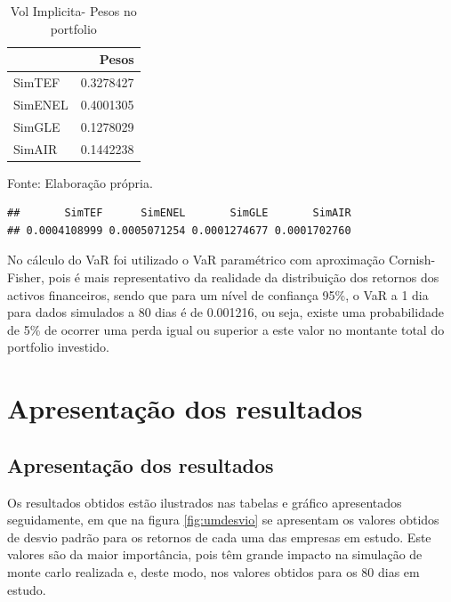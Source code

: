 \documentclass[
  12pt,
  a4paper,
  openany]{book}
\begin{document}
\begin{table}[!h]

\caption{\label{tab:minVIk}Vol Implicita- Pesos no portfolio}
\centering
\begin{tabular}[t]{lr}
\toprule
  & Pesos\\
\midrule
SimTEF & 0.3278427\\
SimENEL & 0.4001305\\
SimGLE & 0.1278029\\
SimAIR & 0.1442238\\
\bottomrule
\end{tabular}
\end{table}
\FloatBarrier
\centering

Fonte: Elaboração própria.

\justifying
\bigskip

\begin{verbatim}
##       SimTEF      SimENEL       SimGLE       SimAIR 
## 0.0004108999 0.0005071254 0.0001274677 0.0001702760
\end{verbatim}

No cálculo do VaR foi utilizado o VaR paramétrico com aproximação Cornish-Fisher, pois é mais representativo da realidade da distribuição dos retornos dos activos financeiros, sendo que para um nível de confiança 95\%, o VaR a 1 dia para dados simulados a 80 dias é de 0.001216, ou seja, existe uma probabilidade de 5\% de ocorrer uma perda igual ou superior a este valor no montante total do portfolio investido.

\hypertarget{apresentauxe7uxe3o-dos-resultados}{%
\chapter{Apresentação dos resultados}\label{apresentauxe7uxe3o-dos-resultados}}

\endgroup
\newpage

\hypertarget{apresentauxe7uxe3o-dos-resultados-1}{%
\section{Apresentação dos resultados}\label{apresentauxe7uxe3o-dos-resultados-1}}

Os resultados obtidos estão ilustrados nas tabelas e gráfico apresentados seguidamente, em que na figura \ref{fig:umdesvio} se apresentam os valores obtidos de desvio padrão para os retornos de cada uma das empresas em estudo. Este valores são da maior importância, pois têm grande impacto na simulação de monte carlo realizada e, deste modo, nos valores obtidos para os 80 dias em estudo.
\end{document}
